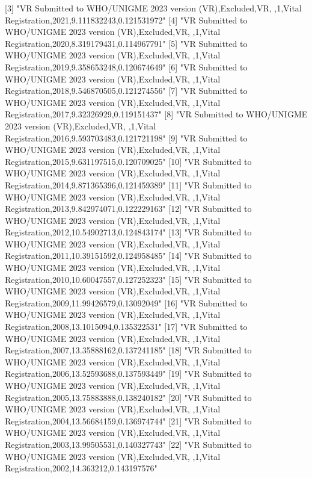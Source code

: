   [3] "VR Submitted to WHO/UNIGME 2023 version (VR),Excluded,VR, ,1,Vital Registration,2021,9.111832243,0.121531972"                 
  [4] "VR Submitted to WHO/UNIGME 2023 version (VR),Excluded,VR, ,1,Vital Registration,2020,8.319179431,0.114967791"                 
  [5] "VR Submitted to WHO/UNIGME 2023 version (VR),Excluded,VR, ,1,Vital Registration,2019,9.358653248,0.120674649"                 
  [6] "VR Submitted to WHO/UNIGME 2023 version (VR),Excluded,VR, ,1,Vital Registration,2018,9.546870505,0.121274556"                 
  [7] "VR Submitted to WHO/UNIGME 2023 version (VR),Excluded,VR, ,1,Vital Registration,2017,9.32326929,0.119151437"                  
  [8] "VR Submitted to WHO/UNIGME 2023 version (VR),Excluded,VR, ,1,Vital Registration,2016,9.593703483,0.121721198"                 
  [9] "VR Submitted to WHO/UNIGME 2023 version (VR),Excluded,VR, ,1,Vital Registration,2015,9.631197515,0.120709025"                 
 [10] "VR Submitted to WHO/UNIGME 2023 version (VR),Excluded,VR, ,1,Vital Registration,2014,9.871365396,0.121459389"                 
 [11] "VR Submitted to WHO/UNIGME 2023 version (VR),Excluded,VR, ,1,Vital Registration,2013,9.842974071,0.122229163"                 
 [12] "VR Submitted to WHO/UNIGME 2023 version (VR),Excluded,VR, ,1,Vital Registration,2012,10.54902713,0.124843174"                 
 [13] "VR Submitted to WHO/UNIGME 2023 version (VR),Excluded,VR, ,1,Vital Registration,2011,10.39151592,0.124958485"                 
 [14] "VR Submitted to WHO/UNIGME 2023 version (VR),Excluded,VR, ,1,Vital Registration,2010,10.60047557,0.127252323"                 
 [15] "VR Submitted to WHO/UNIGME 2023 version (VR),Excluded,VR, ,1,Vital Registration,2009,11.99426579,0.13092049"                  
 [16] "VR Submitted to WHO/UNIGME 2023 version (VR),Excluded,VR, ,1,Vital Registration,2008,13.1015094,0.135322531"                  
 [17] "VR Submitted to WHO/UNIGME 2023 version (VR),Excluded,VR, ,1,Vital Registration,2007,13.35888162,0.137241185"                 
 [18] "VR Submitted to WHO/UNIGME 2023 version (VR),Excluded,VR, ,1,Vital Registration,2006,13.52593688,0.137593449"                 
 [19] "VR Submitted to WHO/UNIGME 2023 version (VR),Excluded,VR, ,1,Vital Registration,2005,13.75883888,0.138240182"                 
 [20] "VR Submitted to WHO/UNIGME 2023 version (VR),Excluded,VR, ,1,Vital Registration,2004,13.56684159,0.136974744"                 
 [21] "VR Submitted to WHO/UNIGME 2023 version (VR),Excluded,VR, ,1,Vital Registration,2003,13.99505531,0.140327743"                 
 [22] "VR Submitted to WHO/UNIGME 2023 version (VR),Excluded,VR, ,1,Vital Registration,2002,14.363212,0.143197576"                   
